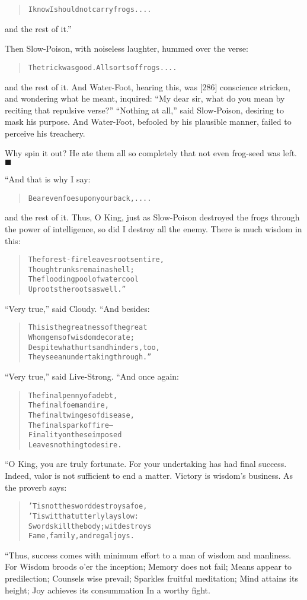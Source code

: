 \documentclass[article, twoside, 14pt]{memoir}
\newcommand{\qed}{\hfill \ensuremath{\blacksquare}}
\renewenvironment{verbatim}{%
\begin{quote}%
\vskip -10pt%
\begin{alltt}\normalfont\large}{\end{alltt}%
\end{quote}%
\vskip -10pt
} %
\begin{document}
\begin{verbatim}
I know I should not carry frogs ....
\end{verbatim}
and the rest of it.”

Then Slow-Poison, with noiseless laughter, hummed over the verse:

\begin{verbatim}
The trick was good. All sorts of frogs ....
\end{verbatim}
and the rest of it. And Water-Foot, hearing this, was [286]
conscience stricken, and wondering what he meant, inquired:
``My dear sir, what do you mean by reciting that repulsive verse?''
``Nothing at all,'' said Slow-Poison, desiring to mask his purpose.
And Water-Foot, befooled by his plausible manner, failed to
perceive his treachery.

Why spin it out? He ate them all so completely that not even
frog-seed was left.\hyperref[s63]{\qed}

“And that is why I say:

\begin{verbatim}
Bear even foes upon your back, ....
\end{verbatim}
and the rest of it. Thus, O King, just as Slow-Poison destroyed the
frogs through the power of intelligence, so did I destroy all the
enemy. There is much wisdom in this:

\begin{verbatim}
The forest-fire leaves roots entire,
    Though trunks remain a shell;
The flooding pool of water cool
    Uproots the roots as well.”
\end{verbatim}
``Very true,'' said Cloudy. “And besides:

\begin{verbatim}
This is the greatness of the great
Whom gems of wisdom decorate;
Despite what hurts and hinders, too,
They see an undertaking through.”
\end{verbatim}
``Very true,'' said Live-Strong. “And once again:

\begin{verbatim}
The final penny of a debt,
    The final foeman dire,
The final twinges of disease,
    The final spark of fire--
Finality on these imposed
    Leaves nothing to desire.
\end{verbatim}
“O King, you are truly fortunate. For your undertaking has had
final success. Indeed, valor is not sufficient to end a matter.
Victory is wisdom's business. As the proverb says:

\begin{verbatim}
'Tis not the sword destroys a foe,
'Tis wit that utterly lays low:
Swords kill the body; wit destroys
Fame, family, and regal joys.
\end{verbatim}
“Thus, success comes with minimum effort to a man of wisdom and
manliness. For Wisdom broods o'er the inception; Memory does not
fail; Means appear to predilection; Counsels wise prevail; Sparkles
fruitful meditation; Mind attains its height; Joy achieves its
consummation In a worthy fight.
\end{document}
